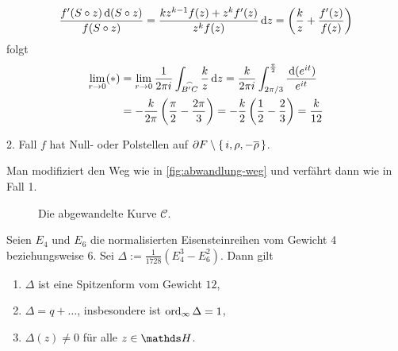 \begin{bewe}
	\[
	\frac{f'(S \circ z) \,\mathrm{d} (S \circ z)}{f(S \circ z)}
	= \frac{kz^{k-1}f(z) + z^kf'(z)}{z^kf(z)} \,\mathrm{d} z
	= \left(\frac{k}{z} + \frac{f'(z)}{f(z)}\right)
	\]
	folgt
	\begin{align*}
	\lim_{r \to 0} (*)
	&= \lim_{r \to 0} \frac{1}{2\pi i} \int_{\stackrel{\frown}{B'C}} \frac{k}{z} \,\mathrm{d} z
	= \frac{k}{2\pi i} \int_{2\pi / 3}^{\frac{\pi}{2}} \frac{\,\mathrm{d}(e^{it})}{e^{it}} \\
	&= - \frac{k}{2\pi} \left(\frac{\pi}{2} - \frac{2\pi}{3}\right)
	= - \frac{k}{2} \left(\frac{1}{2} - \frac{2}{3}\right)
	= \frac{k}{12}
	\end{align*}
	
	
	2. Fall $f$ hat Null- oder Polstellen auf $\partial F \setminus \left\{\,i, \rho, -\overline{\rho}\,\right\}$.
	
	Man modifiziert den Weg wie in \autoref{fig:abwandlung-weg} und verfährt dann wie in Fall 1.
	
	\begin{figure}
	\begin{center}
		
		\caption{Die abgewandelte Kurve $\mathcal C$.}
		\label{fig:abwandlung-weg}
	\end{center}
	\end{figure}
\end{bewe}


\begin{lemm}
	Seien $E_4$ und $E_6$ die normalisierten Eisensteinreihen vom Gewicht $4$ beziehungsweise $6$.
	Sei $\Delta := \frac{1}{1728} (E_4^3 - E_6^2)$.
	Dann gilt
	\begin{enumerate}
		\item $\Delta$ ist eine Spitzenform vom Gewicht $12$,
		\item $\Delta = q + \ldots $, insbesondere ist $\operatorname{ord}_\infty \Delta = 1$,
		\item $\Delta(z) \not= 0$ für alle $z \in \HH$.
	\end{enumerate}
\end{lemm}

